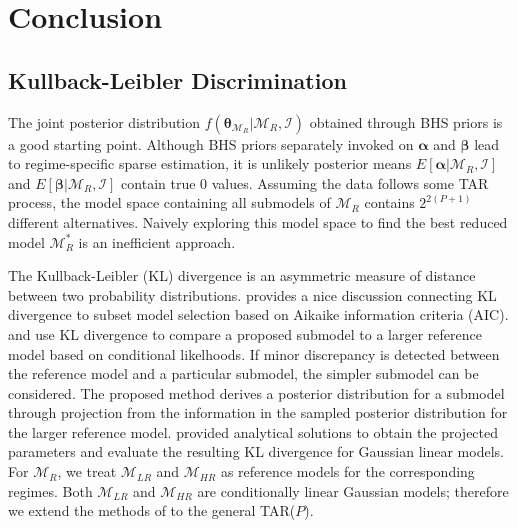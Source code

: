 \section{Conclusion}
















\bigskip
\bigskip
\bigskip
\bigskip
\bigskip


\subsection{Kullback-Leibler Discrimination}
The joint posterior distribution $f(\bm{\theta}_{\mathcal{M}_R}|\mathcal{M}_R,\mathcal{I})$ obtained through BHS priors is  a good starting point. Although BHS priors separately invoked on $\bm{\alpha}$ and $\bm{\beta}$ lead to regime-specific sparse estimation, it is unlikely posterior means $E[\bm{\alpha}|\mathcal{M}_R,\mathcal{I}]$ and $E[\bm{\beta}|\mathcal{M}_R,\mathcal{I}]$ contain true $0$ values.   Assuming the data follows some TAR process, the model space containing all submodels of $\mathcal{M}_R$ contains $2^{2(P+1)}$ different alternatives. Naively exploring this model space to find the best reduced model $\mathcal{M}^*_R$ is an inefficient approach.

The Kullback-Leibler (KL) divergence is an asymmetric measure of distance between two probability distributions\citep{Kullback1951}. \cite{burnham2003} provides a nice discussion connecting KL divergence to subset model selection based on Aikaike information criteria (AIC). \cite{Goutis1998} and \cite{Dupuis2003} use KL divergence to compare a proposed submodel to a larger reference model based on conditional likelhoods. If minor discrepancy is detected between the reference model and a particular submodel, the simpler submodel can be considered. The proposed method derives a posterior distribution for a submodel through projection from the information in the sampled posterior distribution for the larger reference model. \cite{Piironen2017} provided analytical solutions to obtain the projected parameters and evaluate the resulting KL divergence for Gaussian linear models. For $\mathcal{M}_R$, we treat $\mathcal{M}_{LR}$ and $\mathcal{M}_{HR}$ as reference models for the corresponding regimes. Both $\mathcal{M}_{LR}$ and $\mathcal{M}_{HR}$ are conditionally linear Gaussian models; therefore we extend the methods of \cite{Piironen2017} to the general TAR($P$). 

